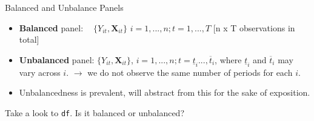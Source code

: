\documentclass[11pt, aspectratio = 169]{beamer}
\begin{document}
\begin{frame}[fragile]{Balanced and Unbalance Panels}

\begin{itemize}
    \item \textbf{Balanced} panel: $\: \: \: \: \{Y_{it}, \boldsymbol{X}_{it}\}$ $i = 1, ..., n; t = 1, . . . , T$  \color{gray}[n x T observations in total] \color{black}
    \item \textbf{Unbalanced} panel: $\{Y_{it}, \boldsymbol{X}_{it}\}$, $i = 1, ..., n; t = \underline{t}_i . . . , \overline{t}_i$,
where $\underline{t}_i$ and $\overline{t}_i$ may vary across $i$. $\rightarrow$ we do not observe the same number of periods for each $i$.
    \pause
    \item[$\rightarrow$] Unbalancedness is prevalent, will abstract from this for the sake of exposition. 
\end{itemize}
\pause
\begin{center}
    Take a look to \texttt{df}. Is it balanced or unbalanced?
\end{center}

\end{frame}
\end{document}
